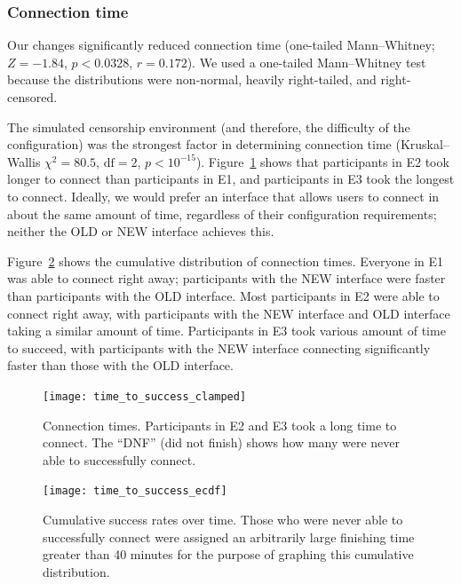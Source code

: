 \documentclass[USenglish,oneside,twocolumn]{article}
\begin{document}

\subsubsection{Connection time} 
Our changes significantly reduced connection time (one-tailed Mann--Whitney; $ Z = -1.84$, $p < 0.0328$, $r= 0.172$). We used a one-tailed Mann--Whitney test because the distributions were non-normal, heavily right-tailed, and right-censored. 

The simulated censorship environment (and therefore, the difficulty of the configuration) was the strongest factor in determining connection time (Kruskal--Wallis $\chi^2 = 80.5$, $\mbox{df} = 2$, $p < 10^{-15}$). Figure~\ref{fig:time_to_success_clamped} shows that participants in E2 took longer to connect than participants in E1, and participants in E3 took the longest to connect. Ideally, we would prefer an interface that allows users to connect in about the same amount of time, regardless of their configuration requirements; neither the OLD or NEW interface achieves this. 

Figure~\ref{fig:time_to_success_ecdf} shows the cumulative distribution of connection times. Everyone in E1 was able to connect right away; participants with the NEW interface were faster than participants with the OLD interface. Most participants in E2 were able to connect right away, with participants with the NEW interface and OLD interface taking a similar amount of time. Participants in E3 took various amount of time to succeed, with participants with the NEW interface connecting significantly faster than those with the OLD interface. 

\begin{figure}[t]
\centering
\texttt{[image: time\_to\_success\_clamped]}
\caption{
Connection times.
Participants in E2 and E3 took a long time to connect.
The ``DNF'' (did not finish) shows how many were never able to successfully connect.}
\label{fig:time_to_success_clamped}
\end{figure}

\begin{figure}[t]
\centering
\texttt{[image: time\_to\_success\_ecdf]}
%
\caption{
Cumulative success rates over time. Those who were never able to successfully connect were assigned an arbitrarily large finishing time greater than 40 minutes for the purpose of graphing this cumulative distribution. 
}
\label{fig:time_to_success_ecdf}
\end{figure}
\end{document}
